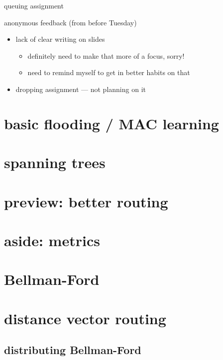 \begin{frame}{queuing assignment}

\begin{frame}{anonymous feedback (from before Tuesday)}
    \begin{itemize}
    \item lack of clear writing on slides
        \begin{itemize}
        \item definitely need to make that more of a focus, sorry!
        \item need to remind myself to get in better habits on that
        \end{itemize}
    \item dropping assignment --- not planning on it
    \end{itemize}
\end{frame}

\section{basic flooding / MAC learning}


\section{spanning trees}


\section{preview: better routing}


\section{aside: metrics}


\section{Bellman-Ford}


\section{distance vector routing}
\subsection{distributing Bellman-Ford}



\end{frame}
